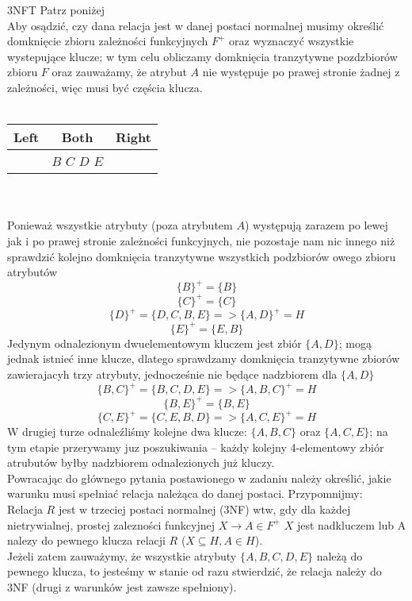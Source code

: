 {3NF}{T}
{Patrz poniżej}{\\}
{Aby osądzić, czy dana relacja jest w danej postaci normalnej musimy określić domknięcie zbioru zależności funkcyjnych $F^+$ oraz wyznaczyć wszystkie wystepujące klucze; w tym celu obliczamy domknięcia tranzytywne pozdzbiorów zbioru $F$ oraz zauważamy, że atrybut $A$ nie występuje po prawej stronie żadnej z zależności, więc musi być częścia klucza.} \\ \\
\begin{tabular}{|c|c|c|} 
\hline
	Left & Both & Right \\ \hline
	& $B$ $C$ $D$ $E$ & \\ \hline
\end{tabular} \\ \\
{Ponieważ wszystkie atrybuty (poza atrybutem $A$) występują zarazem po lewej jak i po prawej stronie zależności funkcyjnych, nie pozostaje nam nic innego niż sprawdzić kolejno domknięcia tranzytywne wszystkich podzbiorów owego zbioru atrybutów}
$$ \{B\}^+ = \{B\} $$
$$ \{C\}^+ = \{C\} $$
$$ \{D\}^+ = \{D, C, B, E\}  => \{A, D\}^+ = H $$
$$ \{E\}^+ = \{E, B\} $$
Jedynym odnalezionym dwuelementowym kluczem jest zbiór $\{A, D\}$; mogą jednak istnieć inne klucze, dlatego sprawdzamy domknięcia tranzytywne zbiorów zawierajacyh trzy atrybuty, jednocześnie nie będące nadzbiorem dla $\{A, D\}$
$$ \{B, C\}^+ = \{B, C, D, E\} => \{A, B, C\}^+ = H $$
$$ \{B, E\}^+ = \{B, E\} $$
$$ \{C, E\}^+ = \{C, E, B, D\} => \{A, C, E\}^+ = H $$
{W drugiej turze odnaleźliśmy kolejne dwa klucze: $\{A, B, C\}$ oraz $\{A, C, E\}$; na tym etapie przerywamy juz poszukiwania -- każdy kolejny 4-elementowy zbiór atrubutów byłby nadzbiorem odnalezionych już kluczy.}
{\\}
{Powracając do głównego pytania postawionego w zadaniu należy określić, jakie warunku musi spełniać relacja należąca do danej postaci. Przypomnijmy: \\
Relacja $R$ jest w trzeciej postaci normalnej (3NF) wtw, gdy dla każdej nietrywialnej, prostej zalezności funkcyjnej $X \rightarrow A \in F^+$ $X$ jest nadkluczem lub A nalezy do pewnego klucza relacji $R$ ($X \subseteq H, A \in H$).
\vspace{0.2cm} \\
Jeżeli zatem zauważymy, że wszystkie atrybuty $\{A, B, C, D, E\}$ należą do pewnego klucza, to jesteśmy w stanie od razu stwierdzić, że relacja należy do 3NF (drugi z warunków jest zawsze spełniony)}.
